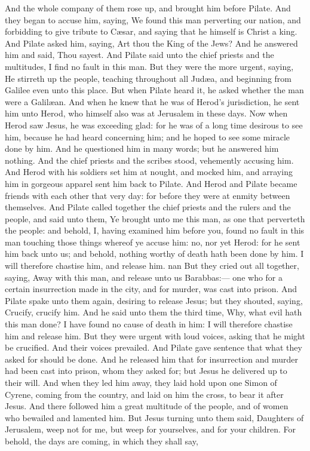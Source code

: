 And the whole company of them rose up, and brought him before Pilate. And they began to accuse him, saying, We found this man perverting our nation, and forbidding to give tribute to Cæsar, and saying that he himself is Christ a king. And Pilate asked him, saying, Art thou the King of the Jews? And he answered him and said, Thou sayest. And Pilate said unto the chief priests and the multitudes, I find no fault in this man. But they were the more urgent, saying, He stirreth up the people, teaching throughout all Judæa, and beginning from Galilee even unto this place. But when Pilate heard it, he asked whether the man were a Galilæan. And when he knew that he was of Herod’s jurisdiction, he sent him unto Herod, who himself also was at Jerusalem in these days.  Now when Herod saw Jesus, he was exceeding glad: for he was of a long time desirous to see him, because he had heard concerning him; and he hoped to see some miracle done by him. And he questioned him in many words; but he answered him nothing. And the chief priests and the scribes stood, vehemently accusing him. And Herod with his soldiers set him at nought, and mocked him, and arraying him in gorgeous apparel sent him back to Pilate. And Herod and Pilate became friends with each other that very day: for before they were at enmity between themselves.  And Pilate called together the chief priests and the rulers and the people, and said unto them, Ye brought unto me this man, as one that perverteth the people: and behold, I, having examined him before you, found no fault in this man touching those things whereof ye accuse him: no, nor yet Herod: for he sent him back unto us; and behold, nothing worthy of death hath been done by him. I will therefore chastise him, and release him. nan But they cried out all together, saying, Away with this man, and release unto us Barabbas:— one who for a certain insurrection made in the city, and for murder, was cast into prison. And Pilate spake unto them again, desiring to release Jesus; but they shouted, saying, Crucify, crucify him. And he said unto them the third time, Why, what evil hath this man done? I have found no cause of death in him: I will therefore chastise him and release him. But they were urgent with loud voices, asking that he might be crucified. And their voices prevailed. And Pilate gave sentence that what they asked for should be done. And he released him that for insurrection and murder had been cast into prison, whom they asked for; but Jesus he delivered up to their will.  And when they led him away, they laid hold upon one Simon of Cyrene, coming from the country, and laid on him the cross, to bear it after Jesus.  And there followed him a great multitude of the people, and of women who bewailed and lamented him. But Jesus turning unto them said, Daughters of Jerusalem, weep not for me, but weep for yourselves, and for your children. For behold, the days are coming, in which they shall say, 